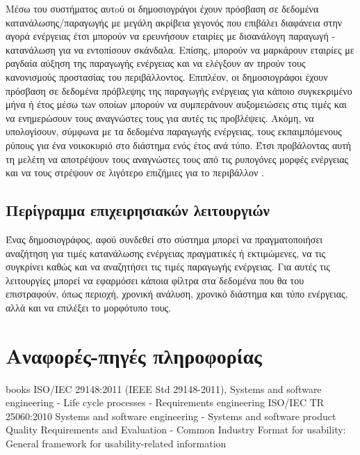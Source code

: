 \documentclass[a4paper,12pt, oneside]{article}
\begin{document}
Μέσω του συστήματος αυτoύ οι δημοσιογράγοι έχουν πρόσβαση σε δεδομένα κατανάλωσης/παραγωγής με μεγάλη ακρίβεια γεγονός που επιβάλει διαφάνεια στην αγορά ενέργειας έτσι μπορούν να ερευνήσουν εταιρίες με δισανάλογη παραγωγή - κατανάλωση για να εντοπίσουν σκάνδαλα. Επίσης, μπορούν να μαρκάρουν εταιρίες με ραγδαία αύξηση της παραγωγής ενέργειας και να ελέγξουν αν τηρούν  τους κανονισμούς  προστασίας του περιβάλλοντος.  Επιπλέον, οι δημοσιογράφοι έχουν πρόσβαση σε δεδομένα πρόβλεψης της παραγωγής ενέργειας για κάποιο συγκεκριμένο μήνα ή έτος μέσω των οποίων μπορούν να συμπεράνουν αυξομειώσεις στις τιμές και να ενημερώσουν τους αναγνώστες τους για αυτές τις προβλέψεις. Ακόμη, να υπολογίσουν, σύμφωνα με τα δεδομένα παραγωγής ενέργειας, τους εκπαιμπόμενους ρύπους για ένα νοικοκυριό στο διάστημα ενός έτος ανά τύπο. Έτσι προβάλοντας αυτή τη μελέτη να αποτρέψουν τους αναγνώστες τους από τις ρυπογόνες μορφές ενέργειας και να τους στρέψουν σε λιγότερο επιζήμιες για το περιβάλλον . 

\subsection{Περίγραμμα επιχειρησιακών λειτουργιών}
Ένας δημοσιογράφος, αφού συνδεθεί στο σύστημα μπορεί να πραγματοποιήσει αναζήτηση για τιμές κατανάλωσης ενέργειας πραγματικές ή εκτιμώμενες, να τις συγκρίνει καθώς και να αναζητήσει τις τιμές παραγωγής ενέργειας. Για αυτές τις λειτουργίες μπορεί να εφαρμόσει κάποια φίλτρα στα δεδομένα που θα του επιστραφούν, όπως περιοχή, χρονική ανάλυση, χρονικό διάστημα και τύπο ενέργειας, αλλά και να  επιλέξει το μορφότυπο τους.

\newpage
\section{Αναφορές-πηγές πληροφορίας}
\begingroup
\renewcommand{\section}{\subsection}
\begin{thebibliography} {books}
\latintext
{} ISO/IEC 29148:2011 (IEEE Std 29148-2011), Systems and software engineering - Life cycle processes - Requirements engineering
 ISO/IEC TR 25060:2010  Systems and software engineering - Systems and software product Quality Requirements and Evaluation - Common Industry Format for usability: General framework for usability-related information
\end{thebibliography}
\endgroup
\end{document}
